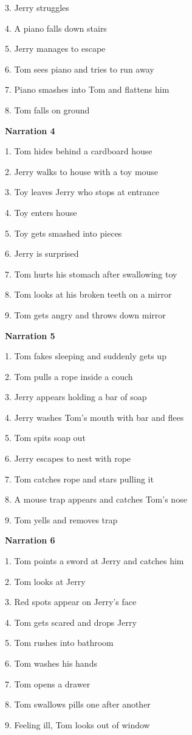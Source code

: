 \documentclass[]{elsarticle} %
\begin{document}
3. Jerry struggles

4. A piano falls down stairs

5. Jerry manages to escape

6. Tom sees piano and tries to run away

7. Piano smashes into Tom and flattens him

8. Tom falls on ground

\textbf{Narration 4}

1. Tom hides behind a cardboard house

2. Jerry walks to house with a toy mouse

3. Toy leaves Jerry who stops at entrance

4. Toy enters house

5. Toy gets smashed into pieces

6. Jerry is surprised

7. Tom hurts his stomach after swallowing toy

8. Tom looks at his broken teeth on a mirror

9. Tom gets angry and throws down mirror

\textbf{Narration 5}

1. Tom fakes sleeping and suddenly gets up

2. Tom pulls a rope inside a couch

3. Jerry appears holding a bar of soap

4. Jerry washes Tom's mouth with bar and flees

5. Tom spits soap out

6. Jerry escapes to nest with rope

7. Tom catches rope and stars pulling it

8. A mouse trap appears and catches Tom's nose

9. Tom yells and removes trap

\textbf{Narration 6}

1. Tom points a sword at Jerry and catches him

2. Tom looks at Jerry

3. Red spots appear on Jerry's face

4. Tom gets scared and drops Jerry

5. Tom rushes into bathroom

6. Tom washes his hands

7. Tom opens a drawer

8. Tom swallows pills one after another

9. Feeling ill, Tom looks out of window
\end{document}
